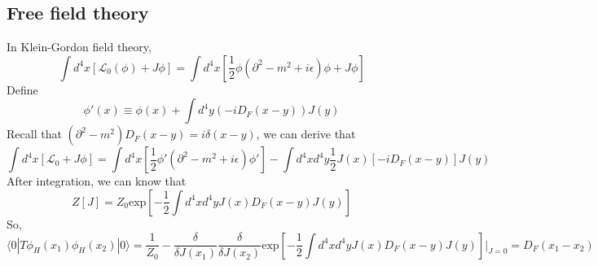 \subsection{Free field theory}
\noindent
In Klein-Gordon field theory,
\[\int d^4x [\mathcal{L}_0(\phi)+J\phi] = \int d^4x [\frac{1}{2}\phi (\partial^2 -m^2+i\epsilon)\phi + J\phi]\]
Define
\[\phi'(x) \equiv \phi(x) + \int d^4y (-iD_F(x-y)) J(y) \]
Recall that $(\partial^2-m^2)D_F(x-y) = i\delta(x-y)$, we can derive that
\[\int d^4x [\mathcal{L}_0+J\phi] = \int d^4x [\frac{1}{2}\phi' (\partial^2 -m^2+i\epsilon)\phi'] - \int d^4x d^4y \frac{1}{2} J(x)[-iD_F(x-y)]J(y)\]
After integration, we can know that
\[Z[J] = Z_0 \mathrm{exp} [-\frac{1}{2} \int d^4x d^4y J(x)D_F(x-y)J(y)]\]
So,
\[\langle 0 | T \phi_H(x_1) \phi_H(x_2) | 0 \rangle =  \frac{1}{Z_0}- \frac{\delta}{\delta J(x_1)} \frac{\delta}{\delta J(x_2)} \mathrm{exp} [-\frac{1}{2} \int d^4x d^4y J(x)D_F(x-y)J(y)]|_{J=0} = D_F(x_1-x_2)\]

